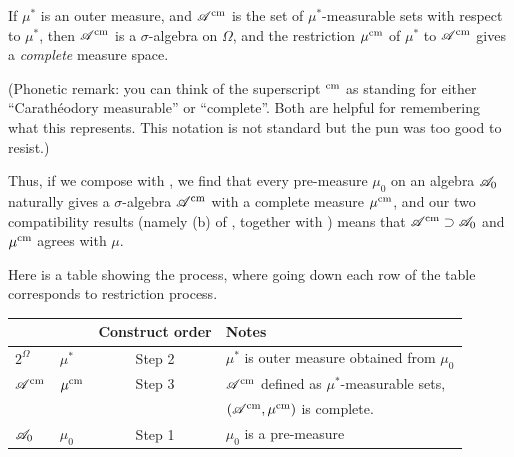 \begin{theorem}
	\label{thm:cara_outer}
	If $\mu^\ast$ is an outer measure,
	and $\mathscr A^\text{cm}$ is the set of $\mu^\ast$-measurable sets
	with respect to $\mu^\ast$,
	then $\mathscr A^\text{cm}$ is a $\sigma$-algebra on $\Omega$,
	and the restriction $\mu^\text{cm}$ of $\mu^\ast$ to $\mathscr A^\text{cm}$
	gives a \emph{complete} measure space.
\end{theorem}
(Phonetic remark: you can think of the superscript ${}^\text{cm}$ as standing
for either ``Carath\'{e}odory measurable'' or ``complete''.
Both are helpful for remembering what this represents.
This notation is not standard but the pun was too good to resist.)

Thus, if we compose  with ,
we find that every pre-measure $\mu_0$ on an algebra $\mathscr A_0$ naturally
gives a $\sigma$-algebra $\mathscr A^\text{cm}$ with a complete measure $\mu^\text{cm}$,
and our two compatibility results
(namely (b) of ,
together with )
means that $\mathscr A^\text{cm} \supset \mathscr A_0$
and $\mu^\text{cm}$ agrees with $\mu$.

Here is a table showing the process,
where going down each row of the table corresponds to restriction process.
\begin{center}
	\begin{tabular}[h]{llcl}
		& & Construct order & Notes \\ \hline
		$2^\Omega$ & $\mu^\ast$ & Step 2 &
			$\mu^\ast$ is outer measure obtained from $\mu_0$ \\[1em]
		$\mathscr A^\text{cm}$ & $\mu^\text{cm}$ & Step 3 & $\mathscr A^\text{cm}$ defined as $\mu^\ast$-measurable sets, \\
		&&& $(\mathscr A^\text{cm}, \mu^\text{cm})$ is complete. \\[1em]
		$\mathscr A_0$ & $\mu_0$ & Step 1 & $\mu_0$ is a pre-measure
	\end{tabular}
\end{center}


